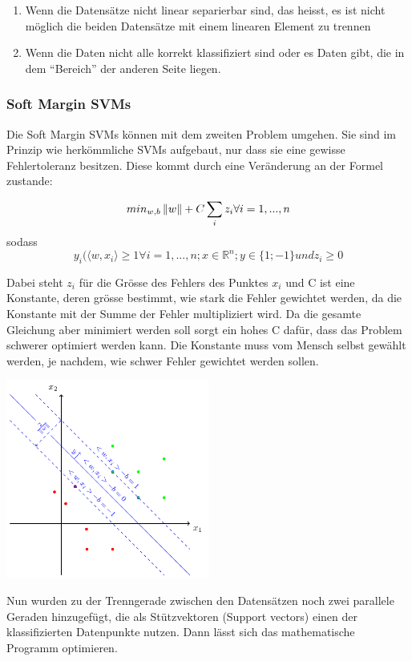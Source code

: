 \begin{enumerate}
	\item Wenn die Datensätze nicht linear separierbar sind, das heisst, es ist nicht möglich die beiden Datensätze mit einem linearen Element zu trennen
	\item Wenn die Daten nicht alle korrekt klassifiziert sind oder es Daten gibt, die in dem "`Bereich"' der anderen Seite liegen.
\end{enumerate}

\subsubsection{Soft Margin SVMs}
Die Soft Margin SVMs können mit dem zweiten Problem umgehen.
Sie sind im Prinzip wie herkömmliche SVMs aufgebaut, nur dass sie eine gewisse Fehlertoleranz besitzen. Diese kommt durch eine Veränderung an der Formel zustande:

\begin{equation*}
	min_{w,b} \left\lVert w\right\rVert + C\sum_{i}{z_{i}} \forall i = 1,...,n
\end {equation*}
sodass
\begin{equation*}
	 y_{i}(\langle w,x_{i} \rangle \geq 1 \forall i = 1,...,n ; x \in \mathbb{R}^n; y \in \{1; -1\}
	und z_{i} \geq 0
	\label{eq: SoftMarginSVMs}
\end{equation*}

Dabei steht $z_{i}$ für die Grösse des Fehlers des Punktes $x_{i}$ und C ist eine Konstante, deren grösse bestimmt, wie stark die Fehler gewichtet werden, da die Konstante mit der Summe der Fehler multipliziert wird. Da die gesamte Gleichung aber minimiert werden soll sorgt ein hohes C dafür, dass das Problem schwerer optimiert werden kann. Die Konstante muss vom Mensch selbst gewählt werden, je nachdem, wie schwer Fehler gewichtet werden sollen.

\begin{dsafigure}
\begin{center}
	\includegraphics[width=0.5\textwidth]{Figure_SVM}
	\caption{Nun wurden zu der Trenngerade zwischen den Datensätzen noch zwei parallele Geraden hinzugefügt, die als Stützvektoren (Support vectors) einen der klassifizierten Datenpunkte nutzen. Dann lässt sich das mathematische Programm optimieren.}
	\label{SVM2}
	\end{center}
\end{dsafigure}

